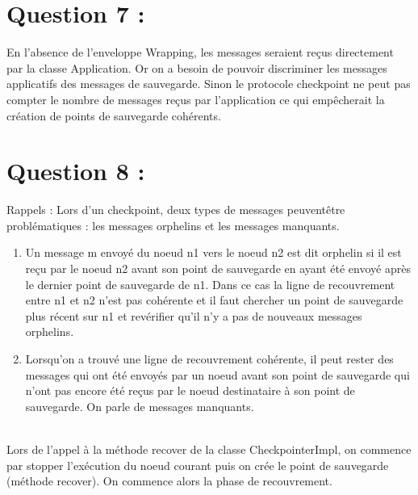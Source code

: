 \documentclass[11pt,a4paper]{report}
\begin{document}
\section{Question 7 :}

En l'absence de l'enveloppe Wrapping, les messages seraient reçus directement par la classe Application. Or on a besoin de pouvoir discriminer les messages applicatifs des messages de sauvegarde. Sinon le protocole checkpoint ne peut pas compter le nombre de messages reçus par l'application ce qui empêcherait la création de points de sauvegarde cohérents.\\


\section{Question 8 :}

Rappels :
Lors d'un checkpoint, deux types de messages peuvent\-être problématiques : les messages orphelins et les messages manquants.\\
\begin{enumerate}
\item Un message m envoyé du noeud n1 vers le noeud n2 est dit orphelin si il est reçu par le noeud n2 avant son point de sauvegarde en ayant été envoyé après le dernier point de sauvegarde de n1. Dans ce cas la ligne de recouvrement entre n1 et n2 n'est pas cohérente et il faut chercher un point de sauvegarde plus récent sur n1 et revérifier qu'il n'y a pas de nouveaux messages orphelins.
\item Lorsqu'on a trouvé une ligne de recouvrement cohérente, il peut rester des messages qui ont été envoyés par un noeud avant son point de sauvegarde qui n'ont pas encore été reçus par le noeud destinataire à son point de sauvegarde. On parle de messages manquants.
\end{enumerate}\\

Lors de l'appel à la méthode recover de la classe CheckpointerImpl, on commence par stopper l'exécution du noeud courant puis on crée le point de sauvegarde (méthode recover). On commence alors la phase de recouvrement.
\end{document}
